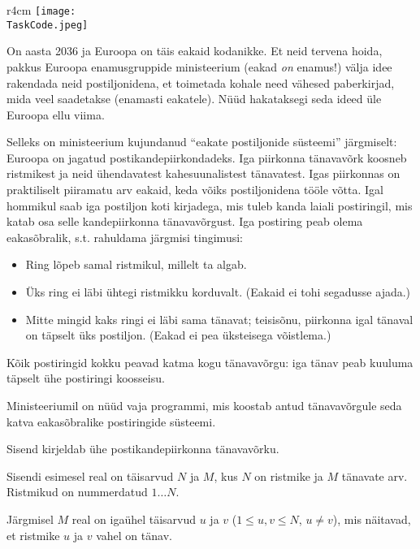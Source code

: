 \documentclass{boi2014-et}
\renewcommand{\TaskCode}{postmen}
\begin{document}
    \begin{wrapfigure}[8]{r}{4cm}
        \vspace{-18pt}
        \texttt{[image: \\TaskCode.jpeg]}
    \end{wrapfigure}

    On aasta 2036 ja Euroopa on täis eakaid kodanikke.
    Et neid tervena hoida, pakkus Euroopa enamusgruppide ministeerium
    (eakad \emph{on} enamus!) välja idee rakendada neid postiljonidena,
    et toimetada kohale need vähesed paberkirjad, mida veel saadetakse
    (enamasti eakatele).
    Nüüd hakataksegi seda ideed üle Euroopa ellu viima.

    Selleks on ministeerium kujundanud ``eakate postiljonide süsteemi''
    järgmiselt:
    Euroopa on jagatud postikandepiirkondadeks. Iga piirkonna tänavavõrk
    koosneb ristmikest ja neid ühendavatest kahesuunalistest tänavatest.
    Igas piirkonnas on praktiliselt piiramatu arv eakaid, keda võiks
    postiljonidena tööle võtta. Igal hommikul saab iga postiljon koti
    kirjadega, mis tuleb kanda laiali postiringil, mis katab osa selle
    kandepiirkonna tänavavõrgust. Iga postiring peab olema eakasõbralik,
    s.t. rahuldama järgmisi tingimusi:
    \begin{itemize}
        \item Ring lõpeb samal ristmikul, millelt ta algab.
        \item Üks ring ei läbi ühtegi ristmikku korduvalt.
            (Eakaid ei tohi segadusse ajada.)
        \item Mitte mingid kaks ringi ei läbi sama tänavat;
            teisisõnu, piirkonna igal tänaval on täpselt üks postiljon.
            (Eakad ei pea üksteisega võistlema.)
    \end{itemize}

    Kõik postiringid kokku peavad katma kogu tänavavõrgu: iga tänav peab
    kuuluma täpselt ühe postiringi koosseisu.

    \Task

    Ministeeriumil on nüüd vaja programmi, mis koostab antud tänavavõrgule
    seda katva eaka\-sõbralike postiringide süsteemi.

    \Input

    Sisend kirjeldab ühe postikandepiirkonna tänavavõrku.

    Sisendi esimesel real on täisarvud $N$ ja $M$, kus $N$ on ristmike ja
    $M$ tänavate arv. Ristmikud on nummerdatud $1 \ldots N$.

    Järgmisel $M$ real on igaühel täisarvud $u$ ja $v$ ($1 \le u, v \le N$,
    $u \ne v$), mis näitavad, et ristmike $u$ ja $v$ vahel on tänav.
\end{document}
